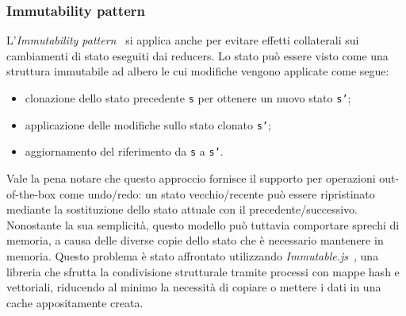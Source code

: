 \subsubsection*{Immutability pattern}
L'\emph{Immutability pattern}~\cite{immutability} si applica anche per evitare effetti collaterali sui cambiamenti di stato
eseguiti dai reducers. Lo stato può essere visto come una struttura immutabile ad albero le cui modifiche vengono applicate come segue:
\begin{itemize}
  \item clonazione dello stato precedente \texttt{s} per ottenere un nuovo stato \texttt{s'};
  \item applicazione delle modifiche sullo stato clonato \texttt{s'};
  \item aggiornamento del riferimento da \texttt{s} a \texttt{s'}.
\end{itemize}
Vale la pena notare che questo approccio fornisce il supporto per operazioni out-of-the-box come undo/redo:
un stato vecchio/recente può essere ripristinato mediante la sostituzione dello stato attuale con il precedente/successivo.
Nonostante la sua semplicità, questo modello può tuttavia comportare sprechi di memoria, a causa delle diverse copie dello
stato che è necessario mantenere in memoria. Questo problema è stato affrontato utilizzando \emph{Immutable.js}~\cite{immutable-js}, una libreria che sfrutta la condivisione strutturale tramite
processi con mappe hash e vettoriali, riducendo al minimo la necessità di copiare o mettere i dati in una cache appositamente creata.
\newpage
